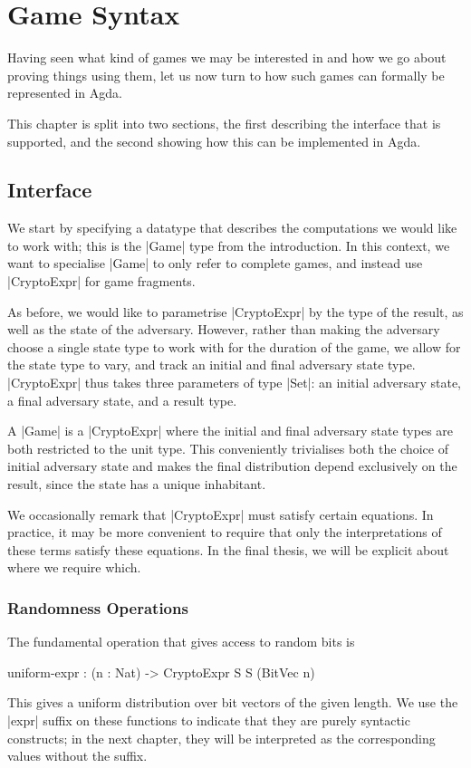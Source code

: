 \chapter{Game Syntax}

Having seen what kind of games we may be interested in and how we go about proving things using them, let us now turn to
how such games can formally be represented in Agda.

This chapter is split into two sections, the first describing the interface that is supported, and the second
showing how this can be implemented in Agda.

\section{Interface}

We start by specifying a datatype that describes the computations we would like to work with; this is the |Game| type
from the introduction.  In this context, we want to specialise |Game| to only refer to complete games, and instead use
|CryptoExpr| for game fragments.

As before, we would like to parametrise |CryptoExpr| by the type of the result, as well as the state of the adversary.
However, rather than making the adversary choose a single state type to work with for the duration of the game, we allow
for the state type to vary, and track an initial and final adversary state type.  |CryptoExpr| thus takes three
parameters of type |Set|: an initial adversary state, a final adversary state, and a result type.

A |Game| is a |CryptoExpr| where the initial and final adversary state types are both restricted to the unit type.  This
conveniently trivialises both the choice of initial adversary state and makes the final distribution depend exclusively
on the result, since the state has a unique inhabitant.

We occasionally remark that |CryptoExpr| must satisfy certain equations.  In practice, it may be more convenient to
require that only the interpretations of these terms satisfy these equations.  In the final thesis, we will be explicit
about where we require which.

\subsection{Randomness Operations}

The fundamental operation that gives access to random bits is
\begin{code}
    uniform-expr :  (n : Nat) -> CryptoExpr S S (BitVec n)
\end{code}
This gives a uniform distribution over bit vectors of the given length.  We use the |expr| suffix on these functions to
indicate that they are purely syntactic constructs; in the next chapter, they will be interpreted as the corresponding
values without the suffix.

